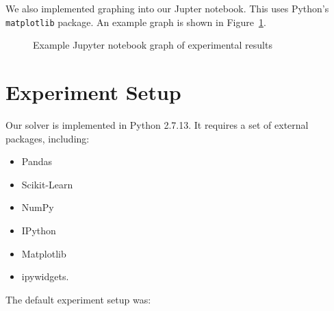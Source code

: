 \documentclass{report}
\begin{document}
  We also implemented graphing into our Jupter notebook.  This uses Python's \texttt{matplotlib} package.  An example graph is shown in Figure~\ref{fig:jupyterGraph}.
  
  \begin{figure}[tb]
    \centering
    \caption{Example Jupyter notebook graph of experimental results}\label{fig:jupyterGraph}
  \end{figure}

  
  \section{Experiment Setup}\label{sec:experimentSetup}
  
  Our solver is implemented in Python 2.7.13.  It requires a set of external packages, including: 
  
  \begin{multicols}{2}
    \begin{itemize}
      \setlength\itemsep{0pt}
      \item Pandas
      \item Scikit-Learn
      \item NumPy
      \item IPython
      \item Matplotlib
      \item ipywidgets\textrm{.}
    \end{itemize}
  \end{multicols}

  The default experiment setup was:
  
\end{document}
